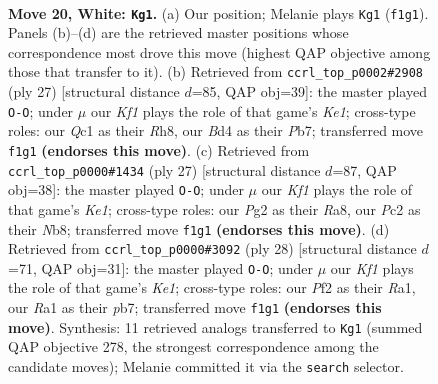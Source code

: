 \documentclass[11pt]{article}
\begin{document}
\clearpage

\begin{figure}[p]\centering
\begin{subfigure}{0.46\textwidth}\centering
\resizebox{\linewidth}{!}{%
\newchessgame
\chessboard[
  setfen={rnb1k1r1/8/3pq3/pp3ppp/3B4/2N5/PPP2PPP/R1Q2K1R w q - 0 20},
  showmover=false,
  pgfstyle=straightmove, color=movearrow, markmove={f1-g1}
]}
\caption{}
\end{subfigure}\hfill
\begin{subfigure}{0.46\textwidth}\centering
\resizebox{\linewidth}{!}{%
\newchessgame
\chessboard[
  setfen={r3k2r/pp3pp1/2n2q1p/8/3Pp3/P1P3PB/4P2P/R2QK2R b KQkq - 0 14},
  showmover=false,
  pgfstyle=straightmove, color=movearrow, markmove={e8-g8}
]}
\caption{}
\end{subfigure}
\\[4pt]
\begin{subfigure}{0.46\textwidth}\centering
\resizebox{\linewidth}{!}{%
\newchessgame
\chessboard[
  setfen={rnb1k2r/1pq2ppp/p7/3p4/3N1PP1/8/PPPQBK1P/R6R b kq - 0 14},
  showmover=false,
  pgfstyle=straightmove, color=movearrow, markmove={e8-g8}
]}
\caption{}
\end{subfigure}\hfill
\begin{subfigure}{0.46\textwidth}\centering
\resizebox{\linewidth}{!}{%
\newchessgame
\chessboard[
  setfen={rn1qk2r/pp2b2p/6p1/1N1p4/4p3/8/PP2QPPP/R1B1K2R w KQkq - 0 15},
  showmover=false,
  pgfstyle=straightmove, color=movearrow, markmove={e1-g1}
]}
\caption{}
\end{subfigure}
\caption{\textbf{Move 20, White: \texttt{Kg1}.} (a) Our position; Melanie plays \texttt{Kg1} (\texttt{f1g1}). Panels (b)--(d) are the retrieved master positions whose correspondence most drove this move (highest QAP objective among those that transfer to it). (b) Retrieved from \texttt{ccrl\_top\_p0002\#2908} (ply 27) [structural distance $d$=85, QAP obj=39]: the master played \texttt{O-O}; under $\mu$ our \emph{Kf1} plays the role of that game's \emph{Ke1}; cross-type roles: our \emph{Q}c1 as their \emph{R}h8, our \emph{B}d4 as their \emph{P}b7; transferred move \texttt{f1g1} \textbf{(endorses this move)}. (c) Retrieved from \texttt{ccrl\_top\_p0000\#1434} (ply 27) [structural distance $d$=87, QAP obj=38]: the master played \texttt{O-O}; under $\mu$ our \emph{Kf1} plays the role of that game's \emph{Ke1}; cross-type roles: our \emph{P}g2 as their \emph{R}a8, our \emph{P}c2 as their \emph{N}b8; transferred move \texttt{f1g1} \textbf{(endorses this move)}. (d) Retrieved from \texttt{ccrl\_top\_p0000\#3092} (ply 28) [structural distance $d$=71, QAP obj=31]: the master played \texttt{O-O}; under $\mu$ our \emph{Kf1} plays the role of that game's \emph{Ke1}; cross-type roles: our \emph{P}f2 as their \emph{R}a1, our \emph{R}a1 as their \emph{p}b7; transferred move \texttt{f1g1} \textbf{(endorses this move)}. Synthesis: 11 retrieved analogs transferred to \texttt{Kg1} (summed QAP objective 278, the strongest correspondence among the candidate moves); Melanie committed it via the \texttt{search} selector.}
\label{fig:thought-m38}
\end{figure}
\end{document}
